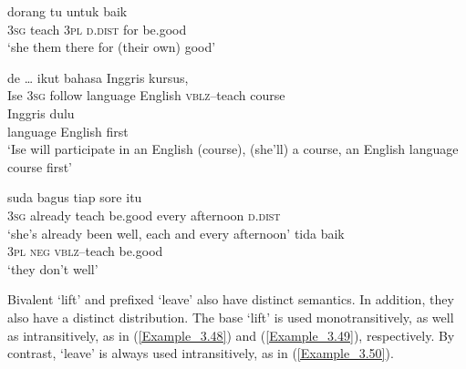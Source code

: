 \ea
\label{Example_3.44}
 {} {dorang} {tu} {untuk} {baik}\\ %
 \textsc{3sg}  teach  \textsc{3pl}  \textsc{d.dist}  for  be.good\\
\glt 
‘she  them there for (their own) good’ \textstyleExampleSource{[081115-001a-Cv.0216]}
\z

\ea
\label{Example_3.45}
 {de} {\ldots} {{ikut}} {bahasa} {Inggris} {} {kursus,}\\ %
 Ise  \textsc{3sg} {}   {follow}  language  English  \textsc{vblz}–teach  course\\
  {Inggris}  {dulu}\\
 {language}  {English}  {first}\\
\glt 
‘Ise will participate in an English (course), (she’ll)  a course, an English language course first’ \textstyleExampleSource{[081025-003-Cv.0223]}
\z

\ea
\label{Example_3.46}
 {suda} {} {bagus} {tiap} {sore} {itu}\\ %
 \textsc{3sg}  already  teach  be.good  every  afternoon  \textsc{d.dist}\\
\glt 
‘she’s already been  well, each and every afternoon’ \textstyleExampleSource{[081115-001a-Cv.0126]}
\z
\ea
\label{Example_3.47}
 {tida} {} {baik}\\ %
 \textsc{3pl}  \textsc{neg}  \textsc{vblz}–teach  be.good\\

\glt 
‘they don’t  well’ \textstyleExampleSource{[081115-001b-Cv.0067]}
\z


Bivalent  ‘lift’ and prefixed  ‘leave’ also have distinct semantics. In addition, they also have a distinct distribution. The base  ‘lift’ is used monotransitively, as well as intransitively, as in (\ref{Example_3.48}) and (\ref{Example_3.49}), respectively. By contrast,  ‘leave’ is always used intransitively, as in (\ref{Example_3.50}).



